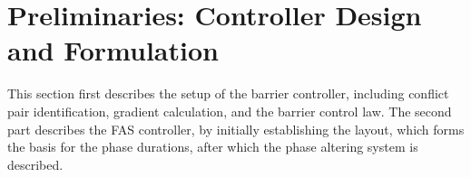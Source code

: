 


\section{Preliminaries: Controller Design and Formulation}
\label{System Overview}
This section first describes the setup of the barrier controller, including conflict pair identification, gradient calculation, and the barrier control law. The second part describes the FAS controller, by initially establishing the layout, which forms the basis for the phase durations, after which the phase altering system is described.



